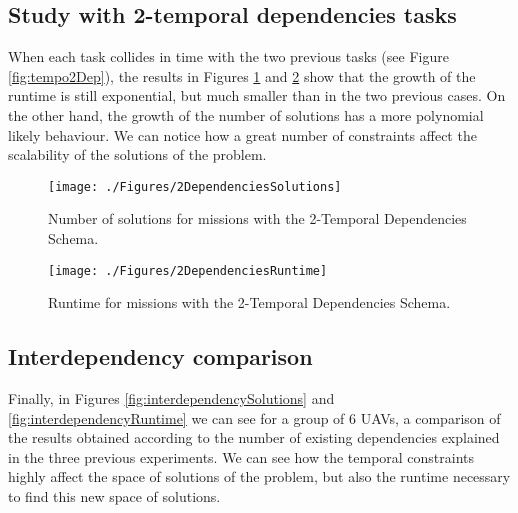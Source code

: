 \subsection{Study with 2-temporal dependencies tasks}
When each task collides in time with the two previous tasks (see Figure \ref{fig:tempo2Dep}), the results in Figures \ref{fig:2DependenciesSolutions} and \ref{fig:2DependenciesRuntime}  show that the growth of the runtime is still exponential, but much smaller than in the two previous cases. On the other hand, the growth of the number of solutions has a more polynomial likely behaviour. We can notice how a great number of constraints affect the scalability of the solutions of the problem.
	
		\begin{figure}[h]
			\centering
			\texttt{[image: ./Figures/2DependenciesSolutions]}
			\caption{Number of solutions for missions with the 2-Temporal Dependencies Schema.}
			\label{fig:2DependenciesSolutions}
		\end{figure}
		\begin{figure}[h]
			\centering
			\texttt{[image: ./Figures/2DependenciesRuntime]}
			\caption{Runtime for missions with the 2-Temporal Dependencies Schema.}
			\label{fig:2DependenciesRuntime}
		\end{figure}

\subsection{Interdependency comparison}	
Finally, in Figures \ref{fig:interdependencySolutions} and \ref{fig:interdependencyRuntime} we can see for a group of 6 UAVs, a comparison of the results obtained according to the number of existing dependencies explained in the three previous experiments. We can see how the temporal constraints highly affect the space of solutions of the problem, but also the runtime necessary to find this new space of solutions.
	
